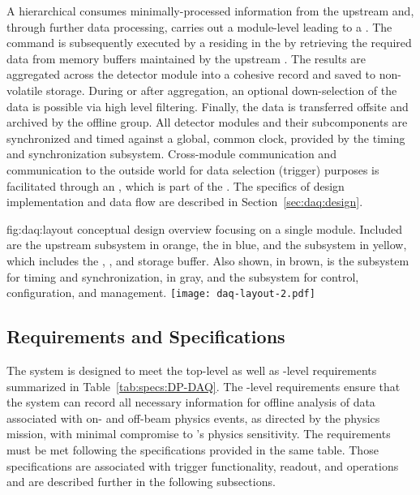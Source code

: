 A
hierarchical  consumes minimally-processed
information from the upstream  and, through further data processing, 
carries out a module-level  leading to a .
The command is subsequently executed by a  residing in the 
by retrieving the required data from memory buffers maintained by the upstream .
The results are aggregated across the detector module into a cohesive record and saved to non-volatile storage.
During or after aggregation, an optional down-selection of the data is possible via
high level filtering.
Finally, the data is  transferred offsite and archived by the  offline group.
All
detector modules and their subcomponents are synchronized and timed against a global,
common clock, provided by the timing and synchronization
subsystem. Cross-module communication and communication
to the outside world for data selection (trigger) purposes is facilitated
through an , which is part of the . The
specifics of design implementation and data flow are described in Section~\ref{sec:daq:design}.

\begin{dunefigure}{fig:daq:layout}{ conceptual design overview focusing
    on a single \nominalmodsize module. Included are the upstream
     subsystem in orange, the  in
    blue, and the  subsystem in yellow,
    which includes the , , and storage buffer. 
    Also shown, in brown, is the subsystem for timing and
    synchronization, in gray, and the subsystem for control,
    configuration, and management.
  }
  \texttt{[image: daq-layout-2.pdf]}
\end{dunefigure}


\subsection{Requirements and Specifications}
\label{sec:daq:requirements}

The    system is designed to meet the
 top-level as well as -level requirements
summarized in 
Table~\ref{tab:specs:DP-DAQ}. 
The -level requirements ensure that the 
system
can record all necessary information for offline 
analysis of data associated with on- and off-beam physics events, as directed
by the  physics mission, with minimal compromise to
's physics sensitivity. The requirements must be met following the 
specifications provided in the same table.
Those specifications are
associated with trigger functionality, readout,
and operations and are described further in the following subsections.

